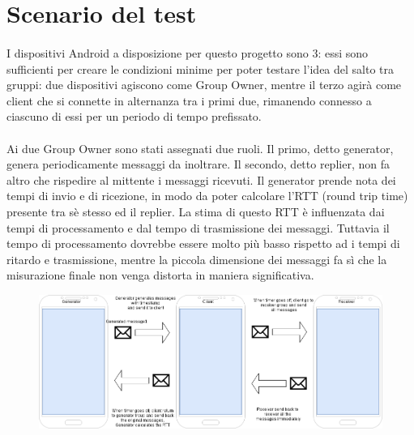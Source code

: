 \documentclass{llncs}
\begin{document}
	
	

\section{Scenario del test}

\paragraph{} I dispositivi Android a disposizione per questo progetto sono 3: essi sono sufficienti per creare le condizioni minime per poter testare l'idea del salto tra gruppi: due dispositivi agiscono come Group Owner, mentre il terzo agirà come client che si connette in alternanza tra i primi due, rimanendo connesso a ciascuno di essi per un periodo di tempo prefissato.

\paragraph{} Ai due Group Owner sono stati assegnati due ruoli. Il primo, detto generator, genera periodicamente messaggi da inoltrare. Il secondo, detto replier, non fa altro che rispedire al mittente i messaggi ricevuti. Il generator prende nota dei tempi di invio e di ricezione, in modo da poter calcolare l'RTT (round trip time) presente tra sè stesso ed il replier. La stima di questo RTT è influenzata dai tempi di processamento e dal tempo di trasmissione dei messaggi. Tuttavia il tempo di processamento dovrebbe essere molto più basso rispetto ad i tempi di ritardo e trasmissione, mentre la piccola dimensione dei messaggi fa sì che la misurazione finale non venga distorta in maniera significativa.

\begin{figure}[H]
	\includegraphics[scale=0.3,center]{img/archp2p.png}
	\caption{}
	\label{label}
\end{figure}
\noindent
\end{document}
